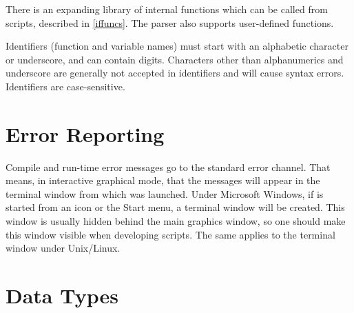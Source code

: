 There is an expanding library of internal functions which can be
called from scripts, described in \ref{iffuncs}.  The parser also
supports user-defined functions.

Identifiers (function and variable names) must start with an
alphabetic character or underscore, and can contain digits. 
Characters other than alphanumerics and underscore are generally not
accepted in identifiers and will cause syntax errors.  Identifiers are
case-sensitive. 

\section{Error Reporting}

Compile and run-time error messages go to the standard error channel. 
That means, in interactive graphical mode, that the messages will
appear in the terminal window from which {\Xic} was launched.  Under
Microsoft Windows, if {\Xic} is started from an icon or the {\cb
Start} menu, a terminal window will be created.  This window is
usually hidden behind the main graphics window, so one should make
this window visible when developing scripts.  The same applies to the
terminal window under Unix/Linux.

\section{Data Types}

